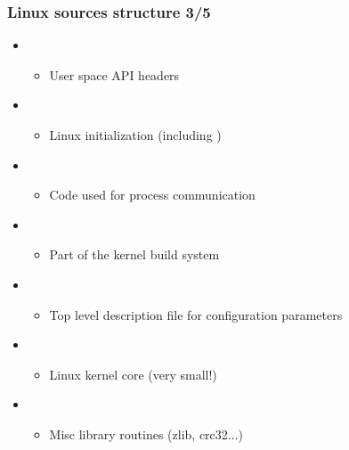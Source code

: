 \begin{frame}
  \frametitle{Linux sources structure 3/5}
  \begin{itemize}
  \item {}
    \begin{itemize}
    \item User space API headers
    \end{itemize}
  \item {}
    \begin{itemize}
    \item Linux initialization (including )
    \end{itemize}
  \item {}
    \begin{itemize}
    \item Code used for process communication
    \end{itemize}
  \item {}
    \begin{itemize}
    \item Part of the kernel build system
    \end{itemize}
  \item {}
    \begin{itemize}
    \item Top level description file for configuration parameters
    \end{itemize}
  \item {}
    \begin{itemize}
    \item Linux kernel core (very small!)
    \end{itemize}
  \item {}
    \begin{itemize}
    \item Misc library routines (zlib, crc32...)
    \end{itemize}
  \end{itemize}
\end{frame}

